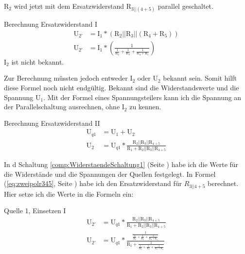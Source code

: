 \documentclass[aspectratio=169, ignorenonframetext]{beamer}
\begin{document}
$\text{R}_2$ wird jetzt mit dem Ersatzwiderstand $\text{R}_{3||(4+5)}$ parallel geschaltet.
\begin{frame}{Berechnung Ersatzwiderstand I}
  \begin{align}
    \text{U}_{2'} &= \text{I}_1 * (\text{R}_2||\text{R}_3||(\text{R}_4+\text{R}_5))\\
    \text{U}_{2'} &= \text{I}_1 *\left(\frac{1}{\frac{1}{\text{R}_2}+\frac{1}{\text{R}_3}+\frac{1}{\text{R}_4+\text{R}_5}}\right )
  \end{align}
  $\text{I}_2$ ist nicht bekannt.
\end{frame}
Zur Berechnung müssten jedoch entweder $\text{I}_2$ oder $\text{U}_2$ bekannt sein. Somit hilft diese Formel noch nicht endgültig. Bekannt sind die Widerstandswerte und die Spannung $\text{U}_1$. Mit der Formel eines Spannungsteilers kann ich die Spannung an der Parallelschaltung ausrechnen, ohne $\text{I}_2$ zu kennen.
\begin{frame}{Berechnung Ersatzwiderstand II}
  \begin{align}
    \text{U}_{q1} &= \text{U}_1 + \text{U}_2\\
    \text{U}_2 &= \text{U}_{q1}*\frac{\text{R}_2||\text{R}_3||\text{R}_{4+5}}{\text{R}_1+ \text{R}_2||\text{R}_3||\text{R}_{4+5}}
  \end{align}
\end{frame}
In d Schaltung \ref{comp:WiderstaendeSchaltung1} (Seite \pageref{comp:WiderstaendeSchaltung1}) habe ich die Werte für die Widerstände und die Spannungen der Quellen festgelegt. In Formel (\ref{eq:zweipolr345}, Seite \pageref{eq:zweipolr345}) habe ich den Ersatzwiderstand für $R_{3||4+5}$ berechnet. Hier setze ich die Werte in die Formeln ein:
\begin{frame}{Quelle 1, Einsetzen I}
  \begin{align}
    \text{U}_{2'} &= \text{U}_{q1}*\frac{\text{R}_2||\text{R}_3||\text{R}_{4+5}}{\text{R}_1 + \text{R}_2||\text{R}_3||\text{R}_{4+5}}\\
    \text{U}_{2'} &= \text{U}_{q1}*\frac{\frac{1}{\frac{1}{\text{R}_2}+\frac{1}{\text{R}_3}+\frac{1}{\text{R}_4+\text{R}_5}}}{\text{R}_1 + \frac{1}{\frac{1}{\text{R}_2}+\frac{1}{\text{R}_3}+\frac{1}{\text{R}_4+\text{R}_5}}}\\
  \end{align}
\end{frame}
\end{document}
